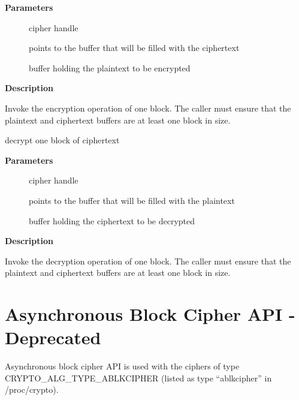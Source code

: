 \documentclass[a4paper,8pt,english]{sphinxmanual}
\begin{document}
\textbf{Parameters}
\begin{description}
\item[{}] \leavevmode
cipher handle

\item[{}] \leavevmode
points to the buffer that will be filled with the ciphertext

\item[{}] \leavevmode
buffer holding the plaintext to be encrypted

\end{description}

\textbf{Description}

Invoke the encryption operation of one block. The caller must ensure that
the plaintext and ciphertext buffers are at least one block in size.

\begin{fulllineitems}
\label{crypto/api-skcipher:c.crypto_cipher_decrypt_one}
decrypt one block of ciphertext

\end{fulllineitems}


\textbf{Parameters}
\begin{description}
\item[{}] \leavevmode
cipher handle

\item[{}] \leavevmode
points to the buffer that will be filled with the plaintext

\item[{}] \leavevmode
buffer holding the ciphertext to be decrypted

\end{description}

\textbf{Description}

Invoke the decryption operation of one block. The caller must ensure that
the plaintext and ciphertext buffers are at least one block in size.


\section{Asynchronous Block Cipher API - Deprecated}
\label{crypto/api-skcipher:asynchronous-block-cipher-api-deprecated}
Asynchronous block cipher API is used with the ciphers of type
CRYPTO\_ALG\_TYPE\_ABLKCIPHER (listed as type ``ablkcipher'' in /proc/crypto).
\end{document}
